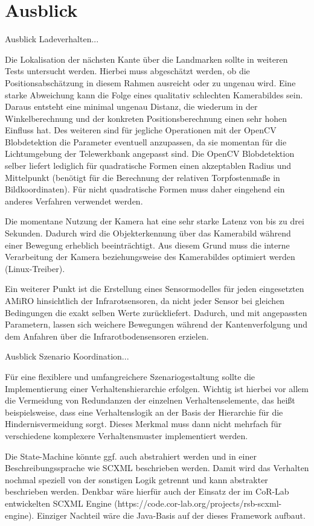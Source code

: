 \chapter{Ausblick} \label{kap:ausblick}

Ausblick Ladeverhalten...

Die Lokalisation der nächsten Kante über die Landmarken sollte in weiteren Tests untersucht werden. Hierbei muss abgeschätzt werden, ob die Positionsabschätzung in diesem Rahmen ausreicht oder zu ungenau wird. Eine starke Abweichung kann die Folge eines qualitativ schlechten Kamerabildes sein. Daraus entsteht eine minimal ungenau Distanz, die wiederum in der Winkelberechnung und der konkreten Positionsberechnung einen sehr hohen Einfluss hat. Des weiteren sind für jegliche Operationen mit der OpenCV Blobdetektion die Parameter eventuell anzupassen, da sie momentan für die Lichtumgebung der Telewerkbank angepasst sind. Die OpenCV Blobdetektion selber liefert lediglich für quadratische Formen einen akzeptablen Radius und Mittelpunkt (benötigt für die Berechnung der relativen Torpfostenmaße in Bildkoordinaten). Für nicht quadratische Formen muss daher eingehend ein anderes Verfahren verwendet werden.

Die momentane Nutzung der Kamera hat eine sehr starke Latenz von bis zu drei Sekunden. Dadurch wird die Objekterkennung über das Kamerabild während einer Bewegung erheblich beeinträchtigt. Aus diesem Grund muss die interne Verarbeitung der Kamera beziehungsweise des Kamerabildes optimiert werden (Linux-Treiber). 

Ein weiterer Punkt ist die Erstellung eines Sensormodelles für jeden eingesetzten AMiRO hinsichtlich der Infrarotsensoren, da nicht jeder Sensor bei gleichen Bedingungen die exakt selben Werte zurückliefert. Dadurch, und mit angepassten Parametern, lassen sich weichere Bewegungen während der Kantenverfolgung und dem Anfahren über die Infrarotbodensensoren erzielen.

Ausblick Szenario Koordination...

Für eine flexiblere und umfangreichere Szenariogestaltung sollte die Implementierung einer Verhaltenshierarchie erfolgen. Wichtig ist hierbei vor allem die Vermeidung von Redundanzen der einzelnen Verhaltenselemente, das heißt beispielsweise, dass eine Verhaltenslogik an der Basis der Hierarchie für die Hindernisvermeidung sorgt. Dieses Merkmal muss dann nicht mehrfach für verschiedene komplexere Verhaltensmuster implementiert werden.

Die State-Machine könnte ggf. auch abstrahiert werden und in einer Beschreibungssprache wie SCXML beschrieben werden. Damit wird das Verhalten nochmal speziell von der sonstigen Logik getrennt und kann abstrakter beschrieben werden. Denkbar wäre hierfür auch der Einsatz der im CoR-Lab entwickelten SCXML Engine (https://code.cor-lab.org/projects/rsb-scxml-engine). Einziger Nachteil wäre die Java-Basis auf der dieses Framework aufbaut.

